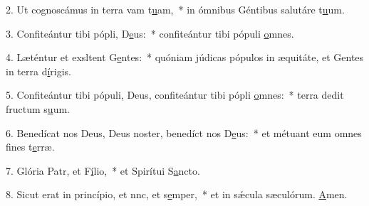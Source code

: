 2. Ut cognoscámus in terra vam t\uline{u}am,~* in ómnibus Géntibus salutáre t\uline{u}um.\par 
3. Confiteántur tibi pópli, D\uline{e}us:~* confiteántur tibi pópuli \uline{o}mnes.\par 
4. Læténtur et exsltent G\uline{e}ntes:~* quóniam júdicas pópulos in æquitáte, et Gentes in terra d\uline{í}rigis.\par 
5. Confiteántur tibi pópuli, Deus, confiteántur tibi pópli \uline{o}mnes:~* terra dedit fructum s\uline{u}um.\par 
6. Benedícat nos Deus, Deus noster, benedíct nos D\uline{e}us:~* et métuant eum omnes fines t\uline{e}rræ.\par 
7. Glória Patr, et F\uline{í}lio,~* et Spirítui S\uline{a}ncto.\par 
8. Sicut erat in princípio, et nnc, et s\uline{e}mper,~* et in sǽcula sæculórum. \uline{A}men.\par 

